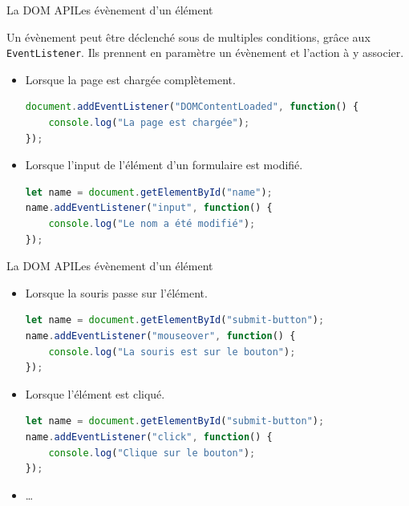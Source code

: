 \documentclass{beamer}
\begin{document}
    \begin{frame}[fragile]{La DOM API}{Les évènement d'un élément}
        \begin{footnotesize}
            Un évènement peut être déclenché sous de multiples conditions, grâce aux \lstinline{EventListener}.
            Ils prennent en paramètre un évènement et l'action à y associer.
            \begin{itemize}
                \item Lorsque la page est chargée complètement.
                \begin{lstlisting}[language=JavaScript,title={\tiny{Script JavaScript}}]
document.addEventListener("DOMContentLoaded", function() {
    console.log("La page est chargée");
});
                \end{lstlisting}
                \item Lorsque l'input de l'élément d'un formulaire est modifié.
                \begin{lstlisting}[language=JavaScript,title={\tiny{Script JavaScript}}]
let name = document.getElementById("name");
name.addEventListener("input", function() {
    console.log("Le nom a été modifié");
});
                \end{lstlisting}
            \end{itemize}
        \end{footnotesize}
    \end{frame}

    \begin{frame}[fragile]{La DOM API}{Les évènement d'un élément}
        \begin{footnotesize}
            \begin{itemize}
                \item Lorsque la souris passe sur l'élément.
                \begin{lstlisting}[language=JavaScript,title={\tiny{Script JavaScript}}]
let name = document.getElementById("submit-button");
name.addEventListener("mouseover", function() {
    console.log("La souris est sur le bouton");
});
                \end{lstlisting}
                \item Lorsque l'élément est cliqué.
                \begin{lstlisting}[language=JavaScript,title={\tiny{Script JavaScript}}]
let name = document.getElementById("submit-button");
name.addEventListener("click", function() {
    console.log("Clique sur le bouton");
});
                \end{lstlisting}
                \item \ldots
            \end{itemize}
        \end{footnotesize}
    \end{frame}
\end{document}
